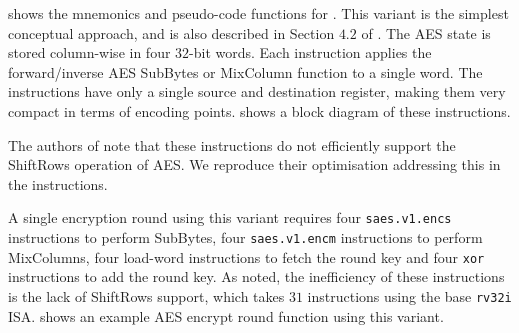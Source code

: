 
 shows the mnemonics and pseudo-code functions
for .
This variant is the simplest conceptual approach, and
is also described in Section $4.2$ of \cite{TilGro:06}.
The AES state is stored column-wise in four $32$-bit words.
Each instruction applies the forward/inverse AES SubBytes or
MixColumn function to a single word.
The instructions have only a single source and destination register,
making them very compact in terms of encoding points.
 shows a block diagram of these
instructions.

The authors of \cite{TilGro:06} note that these instructions do not
efficiently support the ShiftRows operation of AES.  We reproduce their
optimisation addressing this in the  instructions.

A single encryption round using this variant requires
four {\tt saes.v1.encs} instructions to perform SubBytes,
four {\tt saes.v1.encm} instructions to perform MixColumns,
four load-word instructions to fetch the round key
and
four {\tt xor} instructions to add the round key.
As noted, the inefficiency of these instructions is the
lack of ShiftRows support, which takes $31$ instructions using the
base {\tt rv32i} ISA.
 shows an example AES encrypt round function
using this variant.

